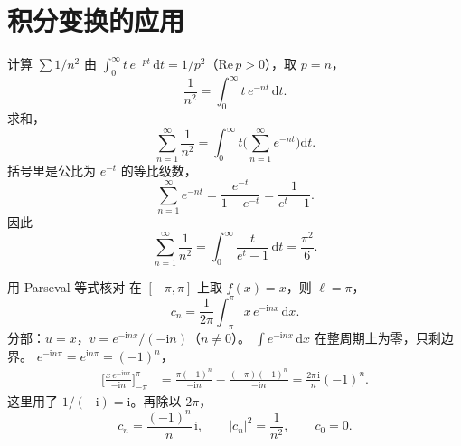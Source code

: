 \documentclass[fontset=windows, chinese, 10pt, xcolor=dvipsnames]{beamer}
\begin{document}
\section{积分变换的应用}

\begin{frame}{计算 $\sum 1/n^2$}
  由 $\displaystyle\int_0^{\infty} t\,e^{-pt}\,\mathrm{d}t=1/p^2$（$\mathrm{Re}\,p>0$），取 $p=n$，
  \begin{equation*}
    \frac{1}{n^2}=\int_0^{\infty} t\,e^{-nt}\,\mathrm{d}t.
  \end{equation*}
  求和，
  \begin{equation*}
    \sum_{n=1}^{\infty}\frac{1}{n^2}
    =\int_0^{\infty} t\Biggl(\sum_{n=1}^{\infty} e^{-nt}\Biggr)\mathrm{d}t.
  \end{equation*}
  括号里是公比为 $e^{-t}$ 的等比级数，
  \begin{equation*}
    \sum_{n=1}^{\infty} e^{-nt}
    =\frac{e^{-t}}{1-e^{-t}}
    =\frac{1}{e^{t}-1}.
  \end{equation*}
  因此
  \begin{equation*}
    \sum_{n=1}^{\infty}\frac{1}{n^2}
    =\int_0^{\infty}\frac{t}{e^{t}-1}\,\mathrm{d}t
    =\frac{\pi^2}{6}.
  \end{equation*}
\end{frame}

\begin{frame}{用 Parseval 等式核对}
  在 $[-\pi,\pi]$ 上取 $f(x)=x$，则 $\ell=\pi$，
  \begin{equation*}
    c_n=\frac{1}{2\pi}\int_{-\pi}^{\pi} x\,e^{-\mathrm{i} nx}\,\mathrm{d}x.
  \end{equation*}
  分部：$u=x$，$v=e^{-\mathrm{i} nx}/(-\mathrm{i} n)$（$n\neq 0$）。
  $\displaystyle\int e^{-\mathrm{i} nx}\,\mathrm{d}x$ 在整周期上为零，只剩边界。
  $e^{-\mathrm{i} n\pi}=e^{\mathrm{i} n\pi}=(-1)^n$，
  \begin{align*}
    \Biggl[\frac{x\,e^{-\mathrm{i} nx}}{-\mathrm{i} n}\Biggr]_{-\pi}^{\pi}
    &=\frac{\pi(-1)^n}{-\mathrm{i} n}
      -\frac{(-\pi)(-1)^n}{-\mathrm{i} n}
     =\frac{2\pi\,\mathrm{i}}{n}(-1)^n.
  \end{align*}
  这里用了 $1/(-\mathrm{i})=\mathrm{i}$。再除以 $2\pi$，
  \begin{equation*}
    c_n=\frac{(-1)^n}{n}\,\mathrm{i},
    \qquad |c_n|^2=\frac{1}{n^2},
    \qquad c_0=0.
  \end{equation*}
\end{frame}
\end{document}
